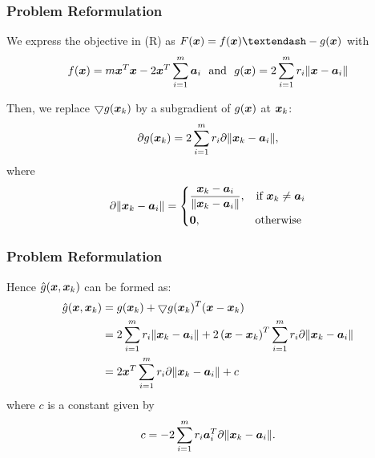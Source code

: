 \documentclass [t] {beamer} %
\begin{document}
\begin{frame} 
\frametitle{Problem Reformulation}
We express the objective in (R) as $F(\Bx) = f(\Bx) –- g(\Bx)$ with 
 \begin{equation}  \nonumber 
f(\mbox{\boldmath$x$}) =  
m \mbox{\boldmath$x$}^T\mbox{\boldmath$x$} - 2 \mbox{\boldmath$x$}^T\sum^m_{i=1} \mbox{\boldmath$a$}_i \ \ \mbox{and } \ g(\mbox{\boldmath$x$}) = 2 \sum^m_{i = 1} r_i \|\mbox{\boldmath$x$} - \mbox{\boldmath$a$}_i\| 
\end{equation}
  
Then, we replace $\bigtriangledown g(\mbox{\boldmath$x$}_k)$ by a subgradient of $g(\mbox{\boldmath$x$})$ at $\mbox{\boldmath$x$}_k$:
\begin{equation} 
\nonumber
\partial g{(\mbox{\boldmath$x$}_k)}  = 2 \sum^m_{i = 1} r_i \partial \|\mbox{\boldmath$x$}_k - \mbox{\boldmath$a$}_i\|, 
\end{equation}
where 
\begin{equation}
\nonumber
\partial \|\mbox{\boldmath$x$}_k - \mbox{\boldmath$a$}_i\|  = \left\{
	\begin{aligned}
	& \frac{\mbox{\boldmath$x$}_k - \mbox{\boldmath$a$}_i}{\|\mbox{\boldmath$x$}_k - \mbox{\boldmath$a$}_i\|}, &\mbox{if } \mbox{\boldmath$x$}_k \neq \mbox{\boldmath$a$}_i \\
	& \mbox{\boldmath{$0$}}, &\mbox{otherwise }
	\end{aligned}
\right.
\end{equation}
\end{frame}

\begin{frame} 
\frametitle{Problem Reformulation}
\phantom{m}
Hence  $ \hat{g}(\mbox{\boldmath$x$},\mbox{\boldmath$x$}_k) $ can be formed as: 
\begin{equation} 
\nonumber
\begin{aligned}
  \hat{g}(\mbox{\boldmath$x$},\mbox{\boldmath$x$}_k)   & =   g(\mbox{\boldmath$x$}_k) +  \bigtriangledown g(\mbox{\boldmath$x$}_k)^T(\mbox{\boldmath$x$} - \mbox{\boldmath$x$}_k) \\
  & =   2 \sum^m_{i=1} r_i \|\mbox{\boldmath$x$}_k - \mbox{\boldmath$a$}_i\|   +  2 \left( \mbox{\boldmath$x$} - \mbox{\boldmath$x$}_k \right)^{T} \sum^m_{i=1} r_i \partial \|\mbox{\boldmath$x$}_k - \mbox{\boldmath$a$}_i\| \\
& = 2\mbox{\boldmath$x$}^T \sum^m_{i=1} r_i \partial \|\mbox{\boldmath$x$}_k - \mbox{\boldmath$a$}_i \| + c
\end{aligned}
\end{equation} 
where $c$ is a constant given  by
\begin{equation} 
\nonumber
 c = - 2 \sum_{i = 1}^m r_i \mbox{\boldmath$a$}_i^T \partial \|\mbox{\boldmath$x$}_k - \mbox{\boldmath$a$}_i\|.
\end{equation} 
\end{frame}
\end{document}
